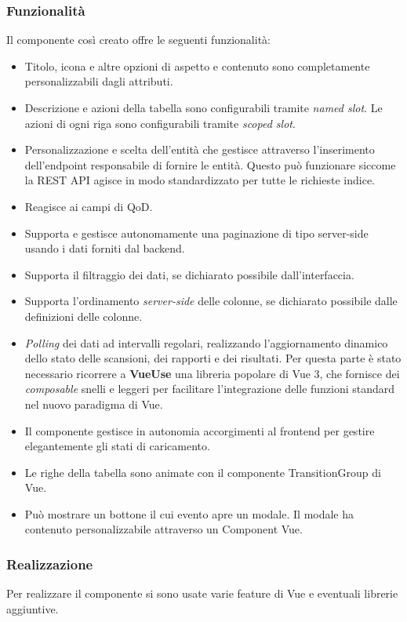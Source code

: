 \subsubsection{Funzionalità}
Il componente così creato offre le seguenti funzionalità:
\begin{itemize}
    \item Titolo, icona e altre opzioni di aspetto e contenuto sono completamente personalizzabili dagli attributi.
    \item Descrizione e azioni della tabella sono configurabili tramite \emph{named slot}. Le azioni di ogni riga sono configurabili tramite \emph{scoped slot}.
    \item Personalizzazione e scelta dell'entità che gestisce attraverso l'inserimento dell'endpoint responsabile di fornire le entità. Questo può funzionare siccome la REST API agisce in modo standardizzato per tutte le richieste indice.
    \item Reagisce ai campi di QoD.
    \item Supporta e gestisce autonomamente una paginazione di tipo server-side usando i dati forniti dal backend.
    \item Supporta il filtraggio dei dati, se dichiarato possibile dall'interfaccia.
    \item Supporta l'ordinamento \emph{server-side} delle colonne, se dichiarato possibile dalle definizioni delle colonne.
    \item \emph{Polling} dei dati ad intervalli regolari, realizzando l'aggiornamento dinamico dello stato delle scansioni, dei rapporti e dei risultati. Per questa parte è stato necessario ricorrere a \textbf{VueUse} una libreria popolare di Vue 3, che fornisce dei \emph{composable} snelli e leggeri per facilitare l'integrazione delle funzioni standard nel nuovo paradigma di Vue.
    \item Il componente gestisce in autonomia accorgimenti al frontend per gestire elegantemente gli stati di caricamento.
    \item Le righe della tabella sono animate con il componente TransitionGroup di Vue.
    \item Può mostrare un bottone il cui evento apre un modale. Il modale ha contenuto personalizzabile attraverso un Component Vue.
\end{itemize}

\subsubsection{Realizzazione}
Per realizzare il componente si sono usate varie feature di Vue e eventuali librerie aggiuntive.

